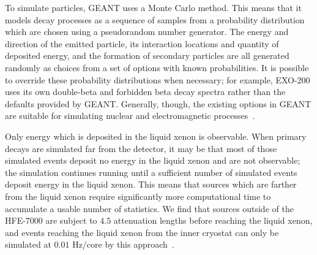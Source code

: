To simulate particles, GEANT uses a Monte Carlo method.  This means that it models decay processes as a sequence of samples from a probability distribution which are chosen using a pseudorandom number generator.  The energy and direction of the emitted particle, its interaction locations  and quantity of deposited energy, and the formation of secondary particles are all generated randomly as choices from a set of options with known probabilities.  It is possible to override these probability distributions when necessary; for example, EXO-200 uses its own double-beta and forbidden beta decay spectra rather than the defaults provided by GEANT.  Generally, though, the existing options in GEANT are suitable for simulating nuclear and electromagnetic processes~\cite{MCDocumentRun2a}.

Only energy which is deposited in the liquid xenon is observable.  When primary decays are simulated far from the detector, it may be that most of those simulated events deposit no energy in the liquid xenon and are not observable; the simulation continues running until a sufficient number of simulated events deposit energy in the liquid xenon.  This means that sources which are farther from the liquid xenon require significantly more computational time to accumulate a usable number of statistics.  We find that sources outside of the HFE-7000 are subject to $4.5$ attenuation lengths before reaching the liquid xenon, and events reaching the liquid xenon from the inner cryostat can only be simulated at $0.01$ Hz/core by this approach~\cite{MCDocumentRun2a}.

